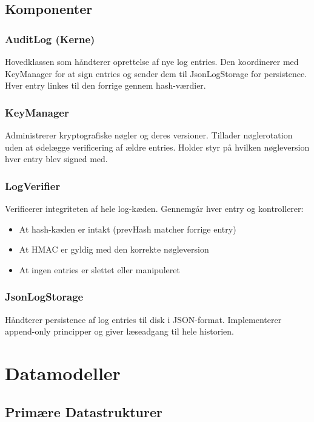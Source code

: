 \documentclass[12pt, a4paper, danish]{article}
\begin{document}
\subsection{Komponenter}

\subsubsection{AuditLog (Kerne)}
Hovedklassen som håndterer oprettelse af nye log entries. Den koordinerer med KeyManager for at sign entries og sender dem til JsonLogStorage for persistence. Hver entry linkes til den forrige gennem hash-værdier.

\subsubsection{KeyManager}
Administrerer kryptografiske nøgler og deres versioner. Tillader nøglerotation uden at ødelægge verificering af ældre entries. Holder styr på hvilken nøgleversion hver entry blev signed med.

\subsubsection{LogVerifier}
Verificerer integriteten af hele log-kæden. Gennemgår hver entry og kontrollerer:
\begin{itemize}
    \item At hash-kæden er intakt (prevHash matcher forrige entry)
    \item At HMAC er gyldig med den korrekte nøgleversion
    \item At ingen entries er slettet eller manipuleret
\end{itemize}

\subsubsection{JsonLogStorage}
Håndterer persistence af log entries til disk i JSON-format. Implementerer append-only principper og giver læseadgang til hele historien.

\newpage
\section{Datamodeller}

\subsection{Primære Datastrukturer}
\end{document}

